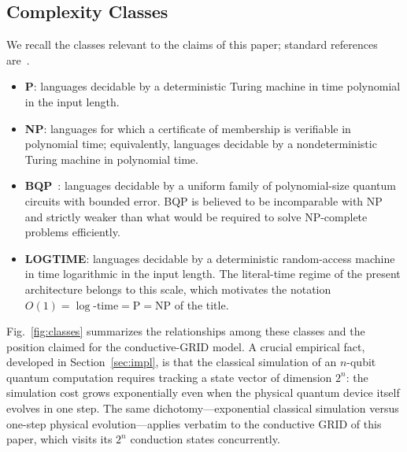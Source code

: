 \documentclass[letterpaper,journal]{IEEEtran}
\begin{document}
\subsection{Complexity Classes}
We recall the classes relevant to the claims of this paper; standard
references are~\cite{arora2009,sipser2012,garey1979,papadimitriou1994}.
\begin{itemize}
  \item \textbf{P}: languages decidable by a deterministic Turing machine in
        time polynomial in the input length.
  \item \textbf{NP}: languages for which a certificate of membership is
        verifiable in polynomial time; equivalently, languages decidable by
        a nondeterministic Turing machine in polynomial time.
  \item \textbf{BQP}~\cite{bernstein1997}: languages decidable by a uniform
        family of polynomial-size quantum circuits with bounded error. BQP
        is believed to be incomparable with NP and strictly weaker than
        what would be required to solve NP-complete problems efficiently.
  \item \textbf{LOGTIME}: languages decidable by a deterministic
        random-access machine in time logarithmic in the input length. The
        literal-time regime of the present architecture belongs to this
        scale, which motivates the notation
        $O(1)=\log\text{-time}=\text{P}=\text{NP}$ of the title.
\end{itemize}
Fig.~\ref{fig:classes} summarizes the relationships among these classes and
the position claimed for the conductive-GRID model. A crucial empirical
fact, developed in Section~\ref{sec:impl}, is that the classical simulation
of an $n$-qubit quantum computation requires tracking a state vector of
dimension $2^{n}$: the simulation cost grows exponentially even when the
physical quantum device itself evolves in one step. The same
dichotomy---exponential classical simulation versus one-step physical
evolution---applies verbatim to the conductive GRID of this paper, which
visits its $2^{n}$ conduction states concurrently.
\end{document}
